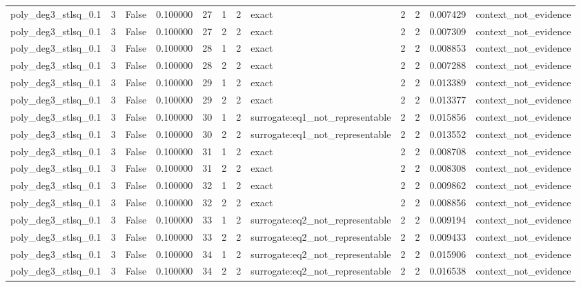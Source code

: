 \begin{tabular}{lrrrrrrlrrrl}
poly\_deg3\_stlsq\_0.1 & 3 & False & 0.100000 & 27 & 1 & 2 & exact & 2 & 2 & 0.007429 & context\_not\_evidence \\
poly\_deg3\_stlsq\_0.1 & 3 & False & 0.100000 & 27 & 2 & 2 & exact & 2 & 2 & 0.007309 & context\_not\_evidence \\
poly\_deg3\_stlsq\_0.1 & 3 & False & 0.100000 & 28 & 1 & 2 & exact & 2 & 2 & 0.008853 & context\_not\_evidence \\
poly\_deg3\_stlsq\_0.1 & 3 & False & 0.100000 & 28 & 2 & 2 & exact & 2 & 2 & 0.007288 & context\_not\_evidence \\
poly\_deg3\_stlsq\_0.1 & 3 & False & 0.100000 & 29 & 1 & 2 & exact & 2 & 2 & 0.013389 & context\_not\_evidence \\
poly\_deg3\_stlsq\_0.1 & 3 & False & 0.100000 & 29 & 2 & 2 & exact & 2 & 2 & 0.013377 & context\_not\_evidence \\
poly\_deg3\_stlsq\_0.1 & 3 & False & 0.100000 & 30 & 1 & 2 & surrogate:eq1\_not\_representable & 2 & 2 & 0.015856 & context\_not\_evidence \\
poly\_deg3\_stlsq\_0.1 & 3 & False & 0.100000 & 30 & 2 & 2 & surrogate:eq1\_not\_representable & 2 & 2 & 0.013552 & context\_not\_evidence \\
poly\_deg3\_stlsq\_0.1 & 3 & False & 0.100000 & 31 & 1 & 2 & exact & 2 & 2 & 0.008708 & context\_not\_evidence \\
poly\_deg3\_stlsq\_0.1 & 3 & False & 0.100000 & 31 & 2 & 2 & exact & 2 & 2 & 0.008308 & context\_not\_evidence \\
poly\_deg3\_stlsq\_0.1 & 3 & False & 0.100000 & 32 & 1 & 2 & exact & 2 & 2 & 0.009862 & context\_not\_evidence \\
poly\_deg3\_stlsq\_0.1 & 3 & False & 0.100000 & 32 & 2 & 2 & exact & 2 & 2 & 0.008856 & context\_not\_evidence \\
poly\_deg3\_stlsq\_0.1 & 3 & False & 0.100000 & 33 & 1 & 2 & surrogate:eq2\_not\_representable & 2 & 2 & 0.009194 & context\_not\_evidence \\
poly\_deg3\_stlsq\_0.1 & 3 & False & 0.100000 & 33 & 2 & 2 & surrogate:eq2\_not\_representable & 2 & 2 & 0.009433 & context\_not\_evidence \\
poly\_deg3\_stlsq\_0.1 & 3 & False & 0.100000 & 34 & 1 & 2 & surrogate:eq2\_not\_representable & 2 & 2 & 0.015906 & context\_not\_evidence \\
poly\_deg3\_stlsq\_0.1 & 3 & False & 0.100000 & 34 & 2 & 2 & surrogate:eq2\_not\_representable & 2 & 2 & 0.016538 & context\_not\_evidence \\

\end{tabular}
